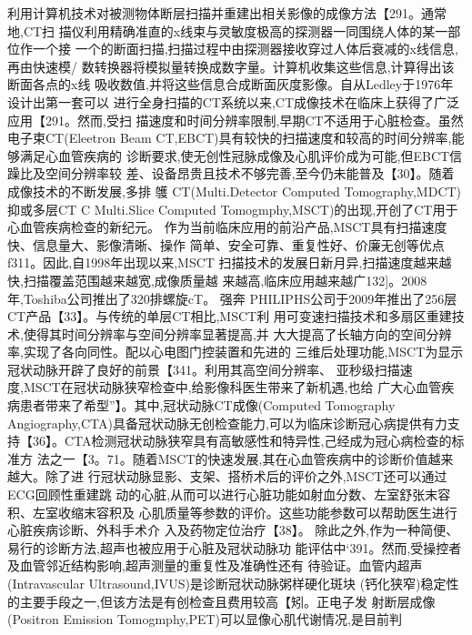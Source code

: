    利用计算机技术对被测物体断层扫描并重建出相关影像的成像方法【291。通常地,CT扫
   描仪利用精确准直的x线束与灵敏度极高的探测器一同围绕人体的某一部位作一个接
   一个的断面扫描,扫描过程中由探测器接收穿过人体后衰减的x线信息,再由快速模/
   数转换器将模拟量转换成数字量。计算机收集这些信息,计算得出该断面各点的x线
   吸收数值,并将这些信息合成断面灰度影像。自从Ledley于1976年设计出第一套可以
   进行全身扫描的CT系统以来,CT成像技术在临床上获得了广泛应用【291。然而,受扫
   描速度和时间分辨率限制,早期CT不适用于心脏检查。虽然电子束CT(Eleetron
   Beam
    CT,EBCT)具有较快的扫描速度和较高的时间分辨率,能够满足心血管疾病的
    诊断要求,使无创性冠脉成像及心肌评价成为可能,但EBCT信躁比及空间分辨率较
    差、设备昂贵且技术不够完善,至今仍未能普及【30】。随着成像技术的不断发展,多排
    鹱
    CT(Multi.Detector Computed Tomography,MDCT)抑或多层CT C Multi.Slice
    Computed
     Tomogmphy,MSCT)的出现,开创了CT用于心血管疾病检查的新纪元。
     作为当前临床应用的前沿产品,MSCT具有扫描速度快、信息量大、影像清晰、操作
     简单、安全可靠、重复性好、价廉无创等优点f311。因此,自1998年出现以来,MSCT
     扫描技术的发展日新月异,扫描速度越来越快,扫描覆盖范围越来越宽,成像质量越
     来越高,临床应用越来越广132]。2008年,Toshiba公司推出了320排螺旋cT。
     强奔
     PHILIPHS公司于2009年推出了256层CT产品【33】。与传统的单层CT相比,MSCT利
     用可变速扫描技术和多扇区重建技术,使得其时间分辨率与空间分辨率显著提高,并
     大大提高了长轴方向的空间分辨率,实现了各向同性。配以心电图门控装置和先进的
     三维后处理功能,MSCT为显示冠状动脉开辟了良好的前景【341。利用其高空间分辨率、
     亚秒级扫描速度,MSCT在冠状动脉狭窄检查中,给影像科医生带来了新机遇,也给
     广大心血管疾病患者带来了希型”】。其中,冠状动脉CT成像(Computed
      Tomography
      Angiography,CTA)具备冠状动脉无创检查能力,可以为临床诊断冠心病提供有力支
      持【36】。CTA检测冠状动脉狭窄具有高敏感性和特异性,己经成为冠心病检查的标准方
      法之一【3。71。随着MSCT的快速发展,其在心血管疾病中的诊断价值越来越大。除了进
      行冠状动脉显影、支架、搭桥术后的评价之外,MSCT还可以通过ECG回顾性重建跳
      动的心脏,从而可以进行心脏功能如射血分数、左室舒张末容积、左室收缩末容积及
      心肌质量等参数的评价。这些功能参数可以帮助医生进行心脏疾病诊断、外科手术介
      入及药物定位治疗【38】。
      除此之外,作为一种简便、易行的诊断方法,超声也被应用于心脏及冠状动脉功
      能评估中‘391。然而,受操控者及血管邻近结构影响,超声测量的重复性及准确性还有
      待验证。血管内超声(Intravascular Ultrasound,IVUS)是诊断冠状动脉粥样硬化斑块
      (钙化狭窄)稳定性的主要手段之一,但该方法是有创检查且费用较高【矧。正电子发
      射断层成像(Positron
       Emission
        Tomogmphy,PET)可以显像心肌代谢情况,是目前判
